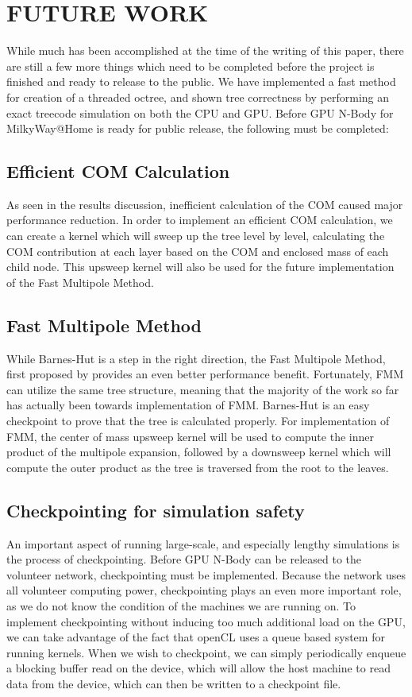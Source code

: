 \documentclass{thesis}
\begin{document}
\chapter{FUTURE WORK}
While much has been accomplished at the time of the writing of this paper, there are still a few more things which need to be completed before the project is finished and ready to release to the public. We have implemented a fast method for creation of a threaded octree, and shown tree correctness by performing an exact treecode simulation on both the CPU and GPU. Before GPU N-Body for MilkyWay@Home is ready for public release, the following must be completed:

\section{Efficient COM Calculation}
As seen in the results discussion, inefficient calculation of the COM caused major performance reduction. In order to implement an efficient COM calculation, we can create a kernel which will sweep up the tree level by level, calculating the COM contribution at each layer based on the COM and enclosed mass of each child node. This upsweep kernel will also be used for the future implementation of the Fast Multipole Method.

\section{Fast Multipole Method}
While Barnes-Hut is a step in the right direction, the Fast Multipole Method, first proposed by \cite{GREENGARD1987} provides an even better performance benefit. Fortunately, FMM can utilize the same tree structure, meaning that the majority of the work so far has actually been towards implementation of FMM. Barnes-Hut is an easy checkpoint to prove that the tree is calculated properly. For implementation of FMM, the center of mass upsweep kernel will be used to compute the inner product of the multipole expansion, followed by a downsweep kernel which will compute the outer product as the tree is traversed from the root to the leaves.

\section{Checkpointing for simulation safety}
An important aspect of running large-scale, and especially lengthy simulations is the process of checkpointing. Before GPU N-Body can be released to the volunteer network, checkpointing must be implemented. Because the network uses all volunteer computing power, checkpointing plays an even more important role, as we do not know the condition of the machines we are running on. To implement checkpointing without inducing too much additional load on the GPU, we can take advantage of the fact that openCL uses a queue based system for running kernels. When we wish to checkpoint, we can simply periodically enqueue a blocking buffer read on the device, which will allow the host machine to read data from the device, which can then be written to a checkpoint file.
\end{document}
